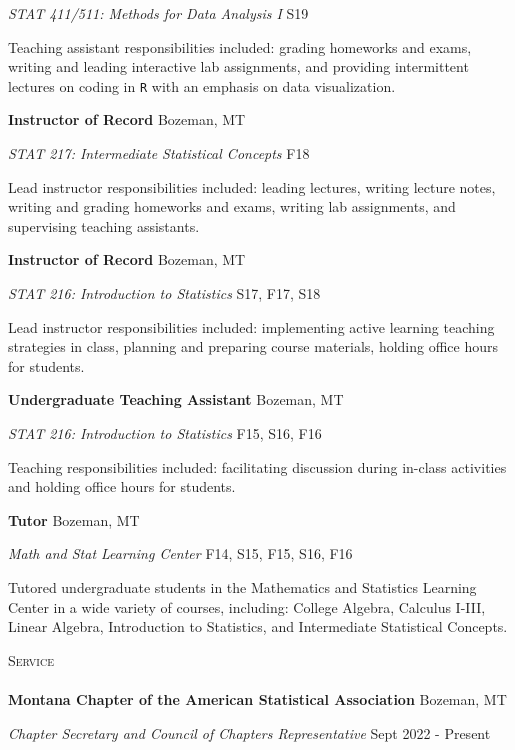 \documentclass[a4paper]{article}
\newcommand{\lineunder} {
	\vspace*{-8pt} \\
	\hspace*{-18pt} \hrulefill \\
}
\newcommand{\header} [1] {
	{\hspace*{-18pt}\vspace*{6pt} \textsc{#1}}
	\vspace*{-6pt} \lineunder
}
\begin{document}
\emph{STAT 411/511: Methods for Data Analysis I} \hfill S19

Teaching assistant responsibilities included: grading homeworks and
exams, writing and leading interactive lab assignments, and providing
intermittent lectures on coding in \texttt{R} with an emphasis on data
visualization. \vspace*{2mm}

\textbf{Instructor of Record} \hfill Bozeman, MT

\emph{STAT 217: Intermediate Statistical Concepts} \hfill F18

Lead instructor responsibilities included: leading lectures, writing
lecture notes, writing and grading homeworks and exams, writing lab
assignments, and supervising teaching assistants. \vspace*{2mm}

\textbf{Instructor of Record} \hfill Bozeman, MT

\emph{STAT 216: Introduction to Statistics} \hfill S17, F17, S18

Lead instructor responsibilities included: implementing active learning
teaching strategies in class, planning and preparing course materials,
holding office hours for students. \vspace*{2mm}

\textbf{Undergraduate Teaching Assistant} \hfill Bozeman, MT

\emph{STAT 216: Introduction to Statistics} \hfill F15, S16, F16

Teaching responsibilities included: facilitating discussion during
in-class activities and holding office hours for students. \vspace*{2mm}

\textbf{Tutor} \hfill Bozeman, MT

\emph{Math and Stat Learning Center} \hfill F14, S15, F15, S16, F16

Tutored undergraduate students in the Mathematics and Statistics
Learning Center in a wide variety of courses, including: College
Algebra, Calculus I-III, Linear Algebra, Introduction to Statistics, and
Intermediate Statistical Concepts.\vspace*{2mm}

\header{Service}

\textbf{Montana Chapter of the American Statistical Association}
\hfill Bozeman, MT

\emph{Chapter Secretary and Council of Chapters Representative}
\hfill Sept 2022 - Present
\end{document}
